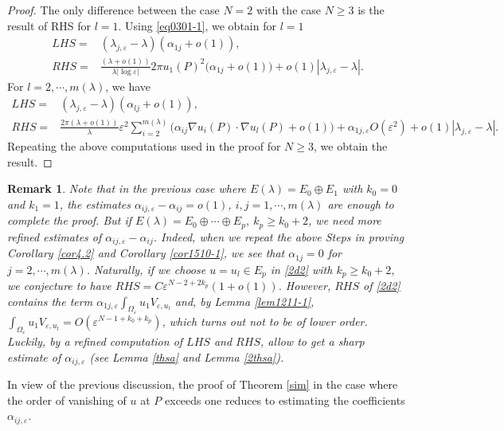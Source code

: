 \documentclass[11pt,reqno]{article}
\newtheorem{rem}[teo]{Remark}
\numberwithin{equation}{section}
\newcommand\e\varepsilon
\newcommand\la\lambda
\renewcommand\O\Omega
\begin{document}
    \begin{proof}
   The only  difference between the case $N=2$ with the case $N\ge3$ is the result of RHS for $l=1$. Using \eqref{eq0301-1}, we obtain for $l=1$
         \begin{equation*}
        \begin{aligned}
            LHS=&(\lambda_{j,\e}-\lambda)\left(\alpha_{1j}+o(1)\right),\\
            RHS=&\frac{(\la+o(1))}{\la |\log\e|}2\pi u_1(P)^2\Big(\alpha_{1j}+o(1)\Big)
       +o(1)|\lambda_{j,\e}-\lambda|.
             \end{aligned}
        \end{equation*}
        For $l=2,\cdots,m(\lambda)$, we have
         \begin{equation*}
        \begin{aligned}
            LHS=&(\lambda_{j,\e}-\lambda)\left(\alpha_{lj}+o(1)\right),\\
            RHS=&\frac{2\pi(\lambda+o(1))}{\lambda}\e^2\sum_{i=2}^{m(\lambda)}\Big( \alpha_{ij}\nabla u_i(P)\cdot\nabla u_l(P) +o(1)\Big)+\alpha_{1j,\e}O(\e^{2})
       +o(1)|\lambda_{j,\e}-\lambda|.
             \end{aligned}
        \end{equation*}
          Repeating the above computations used in the proof for $N\ge3$, we  obtain the result.
    \end{proof}

     \begin{rem}\label{M1}
  Note that  in the previous case where $E(\lambda)=E_0\oplus E_1$  with $k_0=0$ and $k_1=1$,   the estimates $\alpha_{ij,\e}-\alpha_{ij}=o(1)$, $i,j=1,\cdots,m(\lambda)$ are enough to complete the proof. But if $E(\lambda)= E_0\oplus\cdots\oplus E_p,\ k_p\geq k_0+ 2$,  we need more refined estimates of  $\alpha_{ij,\e}-\alpha_{ij}$.  Indeed,  when we repeat the above  Steps in proving Corollary \ref{cor4.2} and Corollary \ref{cor1510-1}, we see that $\alpha_{1j}=0$ for $j=2,\cdots,m(\lambda)$. Naturally, if we choose $u=u_l\in E_p$ in \eqref{2d2} with $k_p\ge k_0+2$, we conjecture to have $ RHS = C\e^{N-2+2k_p}(1+o(1))$.    However, $RHS$ of \eqref{2d2} contains the term  $\alpha_{1j,\e}\int_{\O_\e}u_1 V_{\e,u_l}$ and,  by Lemma \ref{lem1211-1}, $\int_{\O_\e}u_1 V_{\e,u_l}=O(\e^{N-1+k_0+k_p})$, which turns out not to be of lower order.   Luckily, by a refined computation of  $LHS$ and $RHS$, allow to get a sharp estimate of $\alpha_{ij,\e}$ (see Lemma \ref{thsa} and Lemma \ref{2thsa}). 
         \end{rem}
In view of the previous discussion, the proof of Theorem \ref{sim} in the case where the order of vanishing of $u$ at $P$ exceeds one reduces to estimating the coefficients $\alpha_{ij,\e}$. 
\end{document}
